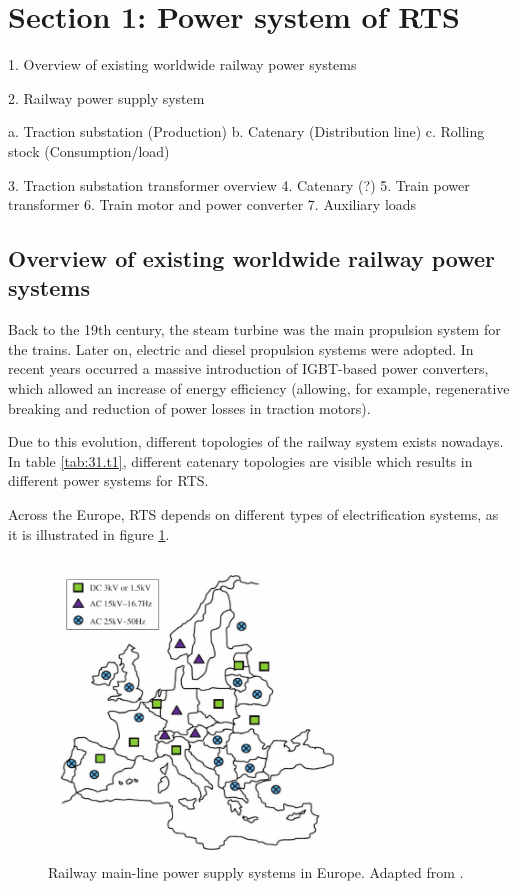 




\section{Section 1: Power system of RTS}

1.	Overview of existing worldwide railway power systems

2.	Railway power supply system

a.	Traction substation (Production)
b.	Catenary (Distribution line)
c.	Rolling stock (Consumption/load)

3.	Traction substation transformer overview
4.	Catenary (?)
5.	Train power transformer
6.	Train motor and power converter
7.	Auxiliary loads

\subsection{Overview of existing worldwide railway power systems}

Back to the 19th century, the steam turbine was the main propulsion system for the trains. Later on, electric and diesel propulsion systems were adopted. In recent years occurred a massive introduction of IGBT-based power converters, which allowed an increase of energy efficiency (allowing, for example, regenerative breaking and reduction of power losses in traction motors).

Due to this evolution, different topologies of the railway system exists nowadays. In table \ref{tab:31.t1}, different catenary topologies are visible which results in different power systems for RTS.




Across the Europe, RTS depends on different types of electrification systems, as it is illustrated in figure \ref{fig:abad2016}.


\begin{figure}[h!]
	\centering
	\includegraphics[width=0.7\textwidth,keepaspectratio]{figures/31.PowerS/abad2016}
	\caption{Railway main-line power supply systems in Europe. Adapted from \cite{abad2016}.}
	\label{fig:abad2016}
\end{figure}




